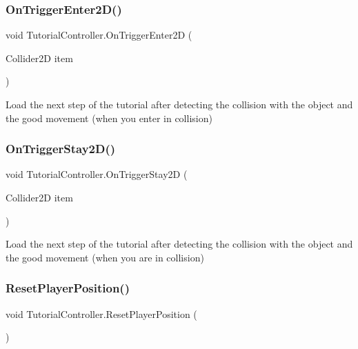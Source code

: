 \subsubsection{\texorpdfstring{On\+Trigger\+Enter2\+D()}{OnTriggerEnter2D()}}
{\footnotesize\ttfamily void Tutorial\+Controller.\+On\+Trigger\+Enter2D (\begin{DoxyParamCaption}\item[{Collider2D}]{item }\end{DoxyParamCaption})\hspace{0.3cm}{\ttfamily [private]}}

Load the next step of the tutorial after detecting the collision with the object and the good movement (when you enter in collision) \mbox{\label{class_tutorial_controller_aee959408bb63b7390577abe6db06e5f1}} 
\subsubsection{\texorpdfstring{On\+Trigger\+Stay2\+D()}{OnTriggerStay2D()}}
{\footnotesize\ttfamily void Tutorial\+Controller.\+On\+Trigger\+Stay2D (\begin{DoxyParamCaption}\item[{Collider2D}]{item }\end{DoxyParamCaption})\hspace{0.3cm}{\ttfamily [private]}}

Load the next step of the tutorial after detecting the collision with the object and the good movement (when you are in collision) \mbox{\label{class_tutorial_controller_a4f842bb1692e3c2bd3c73100a3511dac}} 
\subsubsection{\texorpdfstring{Reset\+Player\+Position()}{ResetPlayerPosition()}}
{\footnotesize\ttfamily void Tutorial\+Controller.\+Reset\+Player\+Position (\begin{DoxyParamCaption}{ }\end{DoxyParamCaption})\hspace{0.3cm}{\ttfamily [private]}}

